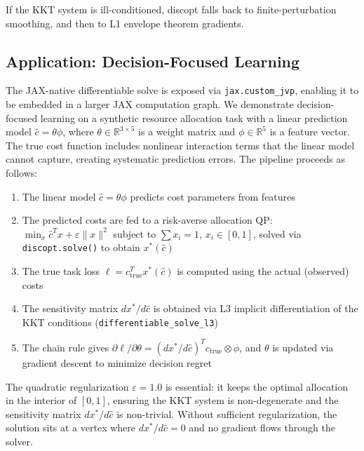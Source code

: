 \documentclass[12pt,preprint]{article}
\begin{document}
If the KKT system is ill-conditioned, discopt falls back to finite-perturbation smoothing, and then to L1 envelope theorem gradients.

\subsection{Application: Decision-Focused Learning}
\label{org-application-decision-focused-learning}
The JAX-native differentiable solve is exposed via \texttt{jax.custom\_jvp}, enabling it to be embedded in a larger JAX computation graph. We demonstrate decision-focused learning on a synthetic resource allocation task with a linear prediction model $\hat{c} = \theta \phi$, where $\theta \in \mathbb{R}^{3 \times 5}$ is a weight matrix and $\phi \in \mathbb{R}^5$ is a feature vector. The true cost function includes nonlinear interaction terms that the linear model cannot capture, creating systematic prediction errors. The pipeline proceeds as follows:

\begin{enumerate}
\item The linear model $\hat{c} = \theta \phi$ predicts cost parameters from features

\item The predicted costs are fed to a risk-averse allocation QP: $\min_x \hat{c}^T x + \varepsilon \|x\|^2$ subject to $\sum x_i = 1$, $x_i \in [0, 1]$, solved via \texttt{discopt.solve()} to obtain $x^*(\hat{c})$

\item The true task loss $\ell = c_{\mathrm{true}}^T x^*(\hat{c})$ is computed using the actual (observed) costs

\item The sensitivity matrix $dx^*/d\hat{c}$ is obtained via L3 implicit differentiation of the KKT conditions (\texttt{differentiable\_solve\_l3})

\item The chain rule gives $\partial \ell / \partial \theta = (dx^*/d\hat{c})^T c_{\mathrm{true}} \otimes \phi$, and $\theta$ is updated via gradient descent to minimize decision regret
\end{enumerate}

The quadratic regularization $\varepsilon = 1.0$ is essential: it keeps the optimal allocation in the interior of $[0, 1]$, ensuring the KKT system is non-degenerate and the sensitivity matrix $dx^*/d\hat{c}$ is non-trivial. Without sufficient regularization, the solution sits at a vertex where $dx^*/d\hat{c} = 0$ and no gradient flows through the solver.
\end{document}
